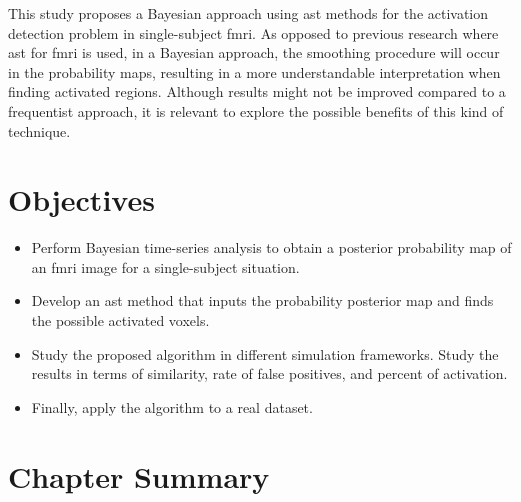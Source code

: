 This study proposes a Bayesian approach using \gls{ast} methods for the 
activation detection problem in single-subject \gls{fmri}. As opposed to 
previous research where \gls{ast} for \gls{fmri} is used, in a Bayesian 
approach, the smoothing procedure will occur in the probability maps, 
resulting in a more understandable interpretation when finding activated 
regions. Although results might not be improved compared to a frequentist 
approach, it is relevant to explore the possible benefits of this kind of 
technique. 

\section{Objectives}

\begin{itemize}
\item Perform Bayesian time-series analysis to obtain a posterior probability 
map of an \gls{fmri} image for a single-subject situation.
\item Develop an \gls{ast} method that inputs the probability posterior map 
and finds the possible activated voxels.
\item Study the proposed algorithm in different simulation frameworks. Study 
the results in terms of similarity, rate of false positives, and percent of 
activation.
\item Finally, apply the algorithm to a real dataset.
\end{itemize}

\section{Chapter Summary}

